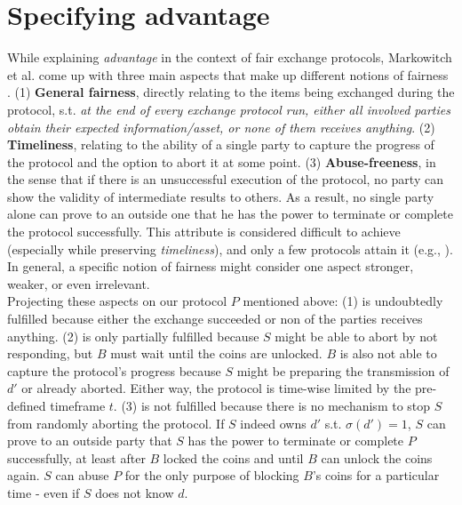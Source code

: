 \documentclass{cacthesis}
\newcounter{protocol}
\begin{document}
        \section{Specifying advantage}
        While explaining \textit{advantage} in the context of fair exchange protocols, Markowitch et al. come up with three main aspects that make up different notions of fairness \cite{10.1007/3-540-36552-4_31}. (1) \textbf{General fairness}, directly relating to the items being exchanged during the protocol, s.t. \textit{at the end of every exchange protocol run, either all involved parties obtain their expected information/asset, or none of them receives anything}.  (2) \textbf{Timeliness}, relating to the ability of a single party to capture the progress of the protocol and the option to abort it at some point. (3) \textbf{Abuse-freeness}, in the sense that if there is an unsuccessful execution of the protocol, no party can show the validity of intermediate results to others. As a result, no single party alone can prove to an outside one that he has the power to terminate or complete the protocol successfully. This attribute is considered difficult to achieve (especially while preserving \textit{timeliness}), and only a few protocols attain it (e.g., \cite{Gao2008}). In general, a specific notion of fairness might consider one aspect stronger, weaker, or even irrelevant. \\
        Projecting these aspects on our protocol $P$ mentioned above: (1) is undoubtedly fulfilled because either the exchange succeeded or non of the parties receives anything. (2) is only partially fulfilled because $S$ might be able to abort by not responding, but $B$ must wait until the coins are unlocked. $B$ is also not able to capture the protocol's progress because $S$ might be preparing the transmission of $d'$ or already aborted. Either way, the protocol is time-wise limited by the pre-defined timeframe $t$. (3) is not fulfilled because there is no mechanism to stop $S$ from randomly aborting the protocol. If $S$ indeed owns $d'$ s.t. $\sigma\left( d'\right) =1$, $S$ can prove to an outside party that $S$ has the power to terminate or complete $P$ successfully, at least after $B$ locked the coins and until $B$ can unlock the coins again. $S$ can abuse $P$ for the only purpose of blocking $B$'s coins for a particular time - even if $S$ does not know $d$. 
        
\end{document}
